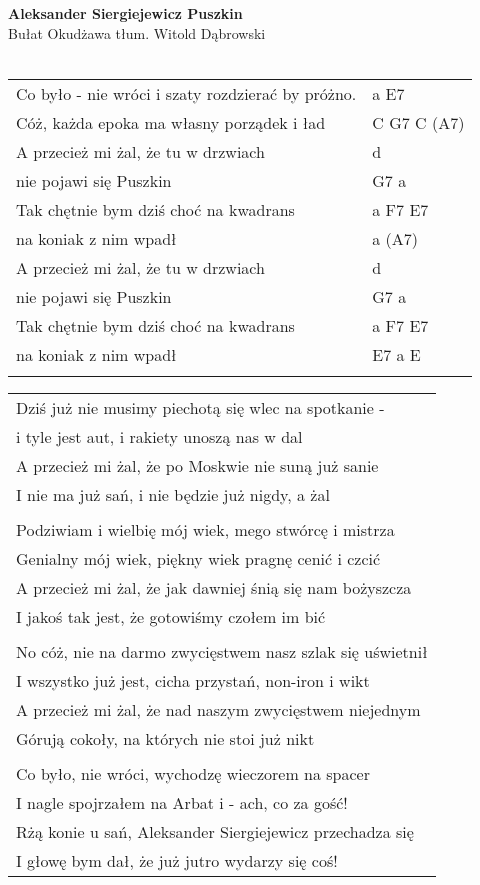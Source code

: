 \documentclass[a5paper]{article}
\begin{document}


\noindent
\fontsize{12pt}{15pt}\selectfont
\textbf{Aleksander Siergiejewicz Puszkin} \\
\fontsize{8pt}{10pt}\selectfont
Bułat Okudżawa tłum. Witold Dąbrowski \\ \\
\fontsize{10pt}{12pt}\selectfont
{}
\begin{tabular}{@{}p{8.5cm}p{3cm}@{}}
\noindent
Co było - nie wróci i szaty rozdzierać by próżno. & a E7 \\
Cóż, każda epoka ma własny porządek i ład & C G7 C (A7) \\
A przecież mi żal, że tu w drzwiach & d \\
nie pojawi się Puszkin & G7 a \\
Tak chętnie bym dziś choć na kwadrans & a F7 E7 \\
na koniak z nim wpadł & a (A7) \\
A przecież mi żal, że tu w drzwiach & d \\
nie pojawi się Puszkin & G7 a \\
Tak chętnie bym dziś choć na kwadrans & a F7 E7 \\
na koniak z nim wpadł & E7 a E \\ \\
\end{tabular}

\noindent
{}
\begin{tabular}{@{}p{10cm}@{}}
\noindent
Dziś już nie musimy piechotą się wlec na spotkanie - \\
i tyle jest aut, i rakiety unoszą nas w dal\\
A przecież mi żal, że po Moskwie nie suną już sanie\\
I nie ma już sań, i nie będzie już nigdy, a żal\\ \\

Podziwiam i wielbię mój wiek, mego stwórcę i mistrza\\
Genialny mój wiek, piękny wiek pragnę cenić i czcić\\
A przecież mi żal, że jak dawniej śnią się nam bożyszcza\\
I jakoś tak jest, że gotowiśmy czołem im bić\\ \\

No cóż, nie na darmo zwycięstwem nasz szlak się uświetnił\\
I wszystko już jest, cicha przystań, non-iron i wikt\\
A przecież mi żal, że nad naszym zwycięstwem niejednym\\
Górują cokoły, na których nie stoi już nikt\\ \\

Co było, nie wróci, wychodzę wieczorem na spacer\\
I nagle spojrzałem na Arbat i - ach, co za gość!\\
Rżą konie u sań, Aleksander Siergiejewicz przechadza się\\
I głowę bym dał, że już jutro wydarzy się coś!
\end{tabular}
\end{document}
